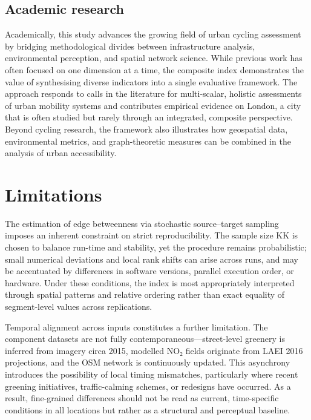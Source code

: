 \documentclass[
  12pt,
  oneside]{book}
\begin{document}
\subsection{Academic research}\label{academic-research}

Academically, this study advances the growing field of urban cycling assessment by bridging methodological divides between infrastructure analysis, environmental perception, and spatial network science. While previous work has often focused on one dimension at a time, the composite index demonstrates the value of synthesising diverse indicators into a single evaluative framework. The approach responds to calls in the literature for multi-scalar, holistic assessments of urban mobility systems and contributes empirical evidence on London, a city that is often studied but rarely through an integrated, composite perspective. Beyond cycling research, the framework also illustrates how geospatial data, environmental metrics, and graph-theoretic measures can be combined in the analysis of urban accessibility.

\section{Limitations}\label{limitations}

The estimation of edge betweenness via stochastic source--target sampling imposes an inherent constraint on strict reproducibility. The sample size KK is chosen to balance run-time and stability, yet the procedure remains probabilistic; small numerical deviations and local rank shifts can arise across runs, and may be accentuated by differences in software versions, parallel execution order, or hardware. Under these conditions, the index is most appropriately interpreted through spatial patterns and relative ordering rather than exact equality of segment-level values across replications.

Temporal alignment across inputs constitutes a further limitation. The component datasets are not fully contemporaneous---street-level greenery is inferred from imagery circa 2015, modelled NO₂ fields originate from LAEI 2016 projections, and the OSM network is continuously updated. This asynchrony introduces the possibility of local timing mismatches, particularly where recent greening initiatives, traffic-calming schemes, or redesigns have occurred. As a result, fine-grained differences should not be read as current, time-specific conditions in all locations but rather as a structural and perceptual baseline.
\end{document}

